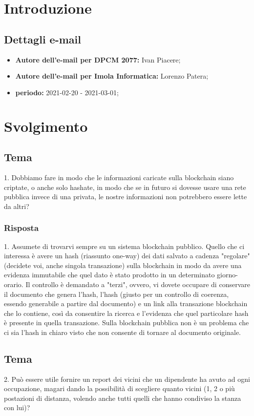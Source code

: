 \section*{Introduzione}
\subsection*{Dettagli e-mail}
\begin{itemize}
	\item \textbf{Autore dell'e-mail per DPCM 2077:} Ivan Piacere;
	\item \textbf{Autore dell'e-mail per Imola Informatica:} Lorenzo Patera;
	\item \textbf{periodo:} 2021-02-20 - 2021-03-01;
\end{itemize}

\section*{Svolgimento}



\subsection*{Tema}
1. Dobbiamo fare in modo che le informazioni caricate sulla blockchain siano criptate, o anche solo hashate, in modo che se in futuro si dovesse usare una rete pubblica invece di una privata, le nostre informazioni non potrebbero essere lette da altri?

\subsubsection{Risposta}
1. Assumete di trovarvi sempre su un sistema blockchain pubblico. Quello che ci interessa è avere un hash (riassunto one-way) dei dati salvato a cadenza "regolare" (decidete voi, anche singola transazione) sulla blockchain in modo da avere una evidenza immutabile che quel dato è stato prodotto in un determinato giorno-orario. Il controllo è demandato a "terzi", ovvero, vi dovete occupare di conservare il documento che genera l'hash, l'hash (giusto per un controllo di coerenza, essendo generabile a partire dal documento) e un link alla transazione blockchain che lo contiene, così da consentire la ricerca e l'evidenza che quel particolare hash è presente in quella transazione. Sulla blockchain pubblica non è un problema che ci sia l'hash in chiaro visto che non consente di tornare al documento originale.
\subsection*{Tema}
2. Può essere utile fornire un report dei vicini che un dipendente ha avuto ad ogni occupazione, magari dando la possibilità di scegliere quanto vicini (1, 2 o più postazioni di distanza, volendo anche tutti quelli che hanno condiviso la stanza con lui)?
